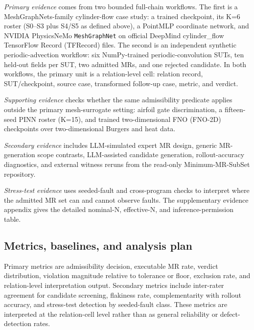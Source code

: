 \documentclass[preprint,12pt,authoryear]{elsarticle}
\begin{document}
\emph{Primary evidence} comes from two bounded full-chain workflows. The first is a MeshGraphNets-family cylinder-flow case study: a trained checkpoint, its K=6 roster (S0--S3 plus S4/S5 as defined above), a PointMLP coordinate network, and NVIDIA PhysicsNeMo \texttt{MeshGraphNet} on official DeepMind cylinder\_flow TensorFlow Record (TFRecord) files. The second is an independent synthetic periodic-advection workflow: six NumPy-trained periodic-convolution SUTs, ten held-out fields per SUT, two admitted MRs, and one rejected candidate. In both workflows, the primary unit is a relation-level cell: relation record, SUT/checkpoint, source case, transformed follow-up case, metric, and verdict.

\emph{Supporting evidence} checks whether the same admissibility predicate applies outside the primary mesh-surrogate setting: airfoil gate discrimination, a fifteen-seed PINN roster (K=15), and trained two-dimensional FNO (FNO-2D) checkpoints over two-dimensional Burgers and heat data.

\emph{Secondary evidence} includes LLM-simulated expert MR design, generic MR-generation scope contrasts, LLM-assisted candidate generation, rollout-accuracy diagnostics, and external witness reruns from the read-only Minimum-MR-SubSet repository.

\emph{Stress-test evidence} uses seeded-fault and cross-program checks to interpret where the admitted MR set can and cannot observe faults. The supplementary evidence appendix gives the detailed nominal-N, effective-N, and inference-permission table.

\subsection{Metrics, baselines, and analysis plan}
\label{subsec:metrics}
\label{subsec:experimental-method}
\label{subsec:baselines}
\label{subsec:rq-evidence}

Primary metrics are admissibility decision, executable MR rate, verdict distribution, violation magnitude relative to tolerance or floor, exclusion rate, and relation-level interpretation output. Secondary metrics include inter-rater agreement for candidate screening, flakiness rate, complementarity with rollout accuracy, and stress-test detection by seeded-fault class. These metrics are interpreted at the relation-cell level rather than as general reliability or defect-detection rates.
\end{document}
